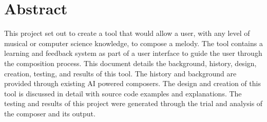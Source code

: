 \chapter*{Abstract} 

This project set out to create a tool that would allow a user, with any level of musical or computer science knowledge, to compose a melody.  The tool contains a learning and feedback system as part of a user interface to guide the user through the composition process.  This document details the background, history, design, creation, testing, and results of this tool.  The history and background are provided through existing AI powered composers.  The design and creation of this tool is discussed in detail with source code examples and explanations.  The testing and results of this project were generated through the trial and analysis of the composer and its output.